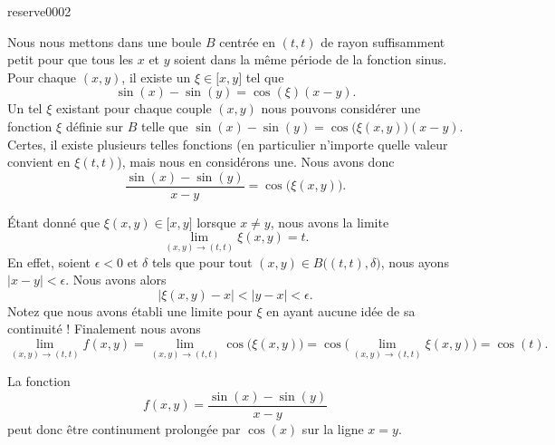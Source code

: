
\begin{corrige}{reserve0002}

	Nous nous mettons dans une boule $B$ centrée en $(t,t)$ de rayon suffisamment petit pour que tous les $x$ et $y$ soient dans la même période de la fonction sinus. Pour chaque $(x,y)$, il existe un $\xi\in\mathopen[ x , y \mathclose]$ tel que
	\begin{equation}
		\sin(x)-\sin(y)=\cos(\xi)(x-y).
	\end{equation}
    Un tel \( \xi\) existant pour chaque couple \( (x,y)\) nous pouvons considérer une fonction $\xi$ définie sur $B$ telle que $\sin(x)-\sin(y)=\cos\big(\xi(x,y)\big)(x-y)$. Certes, il existe plusieurs telles fonctions (en particulier n'importe quelle valeur convient en $\xi(t,t)$), mais nous en considérons une. Nous avons donc
	\begin{equation}
		\frac{ \sin(x)-\sin(y) }{ x-y }=\cos\big( \xi(x,y) \big).
	\end{equation}
	
	Étant donné que $\xi(x,y)\in\mathopen[ x , y \mathclose]$ lorsque $x\neq y$, nous avons la limite
	\begin{equation}
		\lim_{(x,y)\to(t,t)}\xi(x,y)=t.
	\end{equation}
	En effet, soient $\epsilon<0$ et $\delta$ tels que pour tout $(x,y)\in B\big( (t,t),\delta \big)$, nous ayons $| x-y |<\epsilon$. Nous avons alors
	\begin{equation}
		\big| \xi(x,y)-x \big|<| y-x |<\epsilon.
	\end{equation}
	Notez que nous avons établi une limite pour $\xi$ en ayant aucune idée de sa continuité ! Finalement nous avons
	\begin{equation}
		\lim_{(x,y)\to(t,t)}f(x,y)=\lim_{(x,y)\to(t,t)}\cos\big( \xi(x,y) \big)=\cos\big( \lim_{(x,y)\to(t,t)}\xi(x,y) \big)=\cos(t).
	\end{equation}

	La fonction
	\begin{equation}
		f(x,y)=\frac{ \sin(x)-\sin(y) }{ x-y }
	\end{equation}
	peut donc être continument prolongée par $\cos(x)$ sur la ligne $x=y$.
	
\end{corrige}
